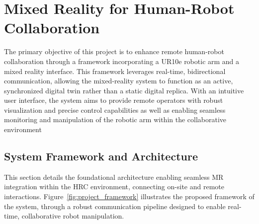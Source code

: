 \chapter{Mixed Reality for Human-Robot Collaboration}   
\label{chapter:on-site}

\begin{introduction}
    The primary objective of this project is to enhance remote human-robot collaboration through a framework incorporating a UR10e robotic arm and a mixed reality interface. This framework leverages real-time, bidirectional communication, allowing the mixed-reality system to function as an active, synchronized digital twin rather than a static digital replica. With an intuitive user interface, the system aims to provide remote operators with robust visualization and precise control capabilities as well as enabling seamless monitoring and manipulation of the robotic arm within the collaborative environment
\end{introduction}


\section{System Framework and Architecture}

This section details the foundational architecture enabling seamless \ac{MR} integration within the \ac{HRC} environment, connecting on-site and remote interactions. Figure~\ref{fig:project_framework} illustrates the proposed framework of the system, through a robust communication pipeline designed to enable real-time, collaborative robot manipulation.

